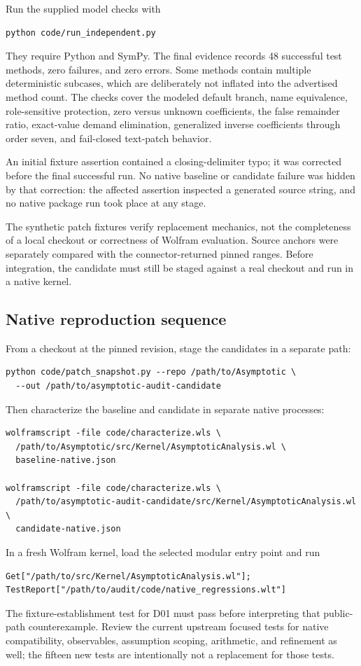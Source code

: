 \documentclass[11pt,letterpaper]{article}
\begin{document}
Run the supplied model checks with
\begin{lstlisting}[language={}]
python code/run_independent.py
\end{lstlisting}
They require Python and SymPy. The final evidence records 48 successful test methods, zero failures, and zero errors. Some methods contain multiple deterministic subcases, which are deliberately not inflated into the advertised method count. The checks cover the modeled default branch, name equivalence, role-sensitive protection, zero versus unknown coefficients, the false remainder ratio, exact-value demand elimination, generalized inverse coefficients through order seven, and fail-closed text-patch behavior.

An initial fixture assertion contained a closing-delimiter typo; it was corrected before the final successful run. No native baseline or candidate failure was hidden by that correction: the affected assertion inspected a generated source string, and no native package run took place at any stage.

The synthetic patch fixtures verify replacement mechanics, not the completeness of a local checkout or correctness of Wolfram evaluation. Source anchors were separately compared with the connector-returned pinned ranges. Before integration, the candidate must still be staged against a real checkout and run in a native kernel.

\subsection{Native reproduction sequence}

From a checkout at the pinned revision, stage the candidates in a separate path:
\begin{lstlisting}[language={}]
python code/patch_snapshot.py --repo /path/to/Asymptotic \
  --out /path/to/asymptotic-audit-candidate
\end{lstlisting}
Then characterize the baseline and candidate in separate native processes:
\begin{lstlisting}[language={}]
wolframscript -file code/characterize.wls \
  /path/to/Asymptotic/src/Kernel/AsymptoticAnalysis.wl \
  baseline-native.json

wolframscript -file code/characterize.wls \
  /path/to/asymptotic-audit-candidate/src/Kernel/AsymptoticAnalysis.wl \
  candidate-native.json
\end{lstlisting}
In a fresh Wolfram kernel, load the selected modular entry point and run
\begin{lstlisting}
Get["/path/to/src/Kernel/AsymptoticAnalysis.wl"];
TestReport["/path/to/audit/code/native_regressions.wlt"]
\end{lstlisting}
The fixture-establishment test for D01 must pass before interpreting that public-path counterexample. Review the current upstream focused tests for native compatibility, observables, assumption scoping, arithmetic, and refinement as well; the fifteen new tests are intentionally not a replacement for those tests.
\end{document}
